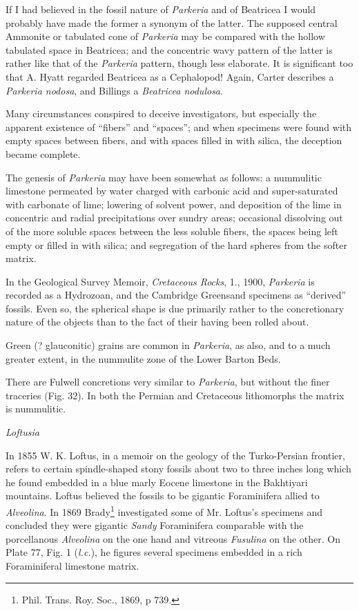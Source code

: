 \documentclass[a4paper, 12pt, oneside]{article}
\begin{document}
If I had believed in the fossil nature of \emph{Parkeria} and of Beatricea I would probably have made the former a synonym of the latter. The supposed central Ammonite or tabulated cone of \emph{Parkeria} may be compared with the hollow tabulated space in Beatricea; and the concentric wavy pattern of the latter is rather like that of the \emph{Parkeria} pattern, though less elaborate. It is significant too that A. Hyatt regarded Beatricea as a Cephalopod! Again, Carter describes a \emph{Parkeria nodosa}, and Billings a \emph{Beatricea nodulosa}.

Many circumstances conspired to deceive investigators, but especially the apparent existence of ``fibers'' and ``spaces''; and when specimens were found with empty spaces between fibers, and with spaces filled in with silica, the deception became complete.

The genesis of \emph{Parkeria} may have been somewhat as follows: a nummulitic limestone permeated by water charged with carbonic acid and super-saturated with carbonate of lime; lowering of solvent power, and deposition of the lime in concentric and radial precipitations over sundry areas; occasional dissolving out of the more soluble spaces between the less soluble fibers, the spaces being left empty or filled in with silica; and segregation of the hard spheres from the softer matrix.

In the Geological Survey Memoir, \emph{Cretaceous Rocks}, 1., 1900, \emph{Parkeria} is recorded as a Hydrozoan, and the Cambridge Greensand specimens as ``derived'' fossils. Even so, the spherical shape is due primarily rather to the concretionary nature of the objects than to the fact of their having been rolled about.

Green (? glauconitic) grains are common in \emph{Parkeria}, as also, and to a much greater extent, in the nummulite zone of the Lower Barton Beds.

There are Fulwell concretions very similar to \emph{Parkeria}, but without the finer traceries (Fig. 32). In both the Permian and Cretaceous lithomorphs the matrix is nummulitic.

\emph{Loftusia}

In 1855 W. K. Loftus, in a memoir on the geology of the Turko-Persian frontier, refers to certain spindle-shaped stony fossils about two to three inches long which he found embedded in a blue marly Eocene limestone in the Bakhtiyari mountains. Loftus believed the fossils to be gigantic Foraminifera allied to \emph{Alveolina}. In 1869 Brady\footnote{Phil. Trans. Roy. Soc., 1869, p 739.} investigated some of Mr. Loftus's specimens and concluded they were gigantic \emph{Sandy} Foraminifera comparable with the porcellanous \emph{Alveolina} on the one hand and vitreous \emph{Fusulina} on the other. On Plate 77, Fig. 1 (\emph{l.c.}), he figures several specimens embedded in a rich Foraminiferal limestone matrix.
\end{document}
